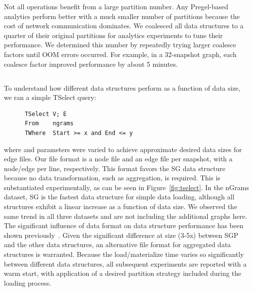 Not all operations benefit from a large partition number.  Any
Pregel-based analytics perform better with a much smaller number of
partitions because the cost of network communication dominates.  We
coalesced all data structures to a quarter of their original
partitions for analytics experiments to tune their performance.  We
determined this number by repeatedly trying larger coalesce factors
until OOM errors occurred.  For example, in a 32-snapshot graph, each
coalesce factor improved performance by about 5 minutes.

\subsection{}

To understand how different data structures perform as a function of
data size, we ran a simple TSelect query:

\begin{small}
\begin{verbatim}
      TSelect V; E
      From    ngrams
      TWhere  Start >= x and End <= y
\end{verbatim}
\end{small}

where  and  parameters were varied to achieve
approximate desired data sizes for edge files.  Our file format is a
node file and an edge file per snapshot, with a node/edge per line,
respectively.  This format favors the SG data structure because no
data transformation, such as aggregation, is required.  This is
substantiated experimentally, as can be seen in
Figure~\ref{fig:tselect}.  In the nGrams dataset, SG is the fastest
data structure for simple data loading, although all structures
exhibit a linear increase as a function of data size.  We observed the
same trend in all three datasets and are not including the additional
graphs here.   The significant influence of data format on data structure
performance has been shown
previously~\cite{DBLP:journals/tos/MiaoHLWYZPCC15}.  Given the
significant difference at size (3-5x) between SGP and the other data
structures, an alternative file format for aggregated data structures
is warranted.  Because the load/materialize time varies so
significantly between different data structures, all subsequent
experiments are reported with a warm start, with application of a
desired partition strategy included during the loading process.

